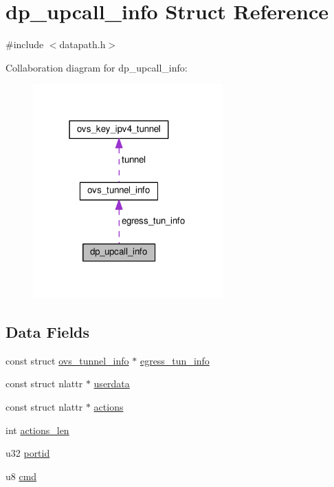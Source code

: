 \hypertarget{structdp__upcall__info}{}\section{dp\+\_\+upcall\+\_\+info Struct Reference}
\label{structdp__upcall__info}


{\ttfamily \#include $<$datapath.\+h$>$}



Collaboration diagram for dp\+\_\+upcall\+\_\+info\+:
\nopagebreak
\begin{figure}[H]
\begin{center}
\leavevmode
\includegraphics[width=207pt]{structdp__upcall__info__coll__graph}
\end{center}
\end{figure}
\subsection*{Data Fields}
\begin{DoxyCompactItemize}
\item 
const struct \hyperlink{structovs__tunnel__info}{ovs\+\_\+tunnel\+\_\+info} $\ast$ \hyperlink{structdp__upcall__info_a74a70c7b1f24487fd51d0f0c5aa1c11e}{egress\+\_\+tun\+\_\+info}
\item 
const struct nlattr $\ast$ \hyperlink{structdp__upcall__info_a78d8f8bd4a0418b043a3a2401e516d5a}{userdata}
\item 
const struct nlattr $\ast$ \hyperlink{structdp__upcall__info_a0e948e89cb162118d95c37d8c2a6c5c3}{actions}
\item 
int \hyperlink{structdp__upcall__info_ad5ccfb55799f138fa7d01461e2035d1f}{actions\+\_\+len}
\item 
u32 \hyperlink{structdp__upcall__info_a4300576f43ab3d9293453d9c664de818}{portid}
\item 
u8 \hyperlink{structdp__upcall__info_afdbbbb0aef83ab4652e15715db247d22}{cmd}
\end{DoxyCompactItemize}



